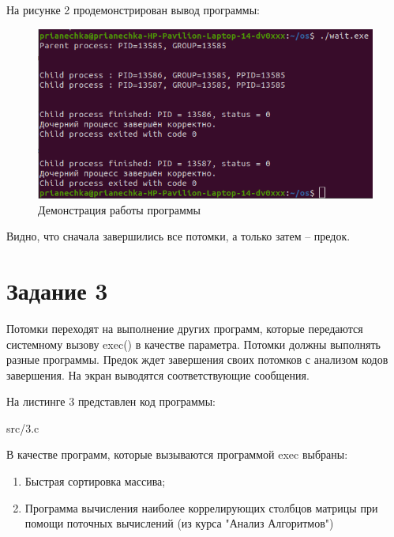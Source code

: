 На рисунке 2 продемонстрирован вывод программы:
\FloatBarrier
\begin{figure}[h]
	\begin{center}
		\includegraphics[]{inc/second.png}
	\end{center}
	\caption{Демонстрация работы программы}
\end{figure}
\FloatBarrier

Видно, что сначала завершились все потомки, а только затем -- предок.

\chapter*{Задание 3}
Потомки переходят на выполнение других программ, которые передаются системному вызову exec() в качестве параметра. 
Потомки должны выполнять разные программы. 
Предок ждет завершения своих потомков с анализом кодов завершения. 
На экран выводятся соответствующие сообщения.

На листинге 3 представлен код программы:

\FloatBarrier
\begin{lstinputlisting}[language=C++, caption=Код задания 3, 
	linerange={1-84}, basicstyle=\footnotesize\ttfamily, showstringspaces=false, frame=single,breaklines=true]{src/3.c}
\end{lstinputlisting}
\FloatBarrier

В качестве программ, которые вызываются программой exec выбраны:
\begin{enumerate}
	\item Быстрая сортировка массива;
	\item Программа вычисления наиболее коррелирующих столбцов матрицы при помощи поточных вычислений (из курса "Анализ Алгоритмов")
\end{enumerate}

